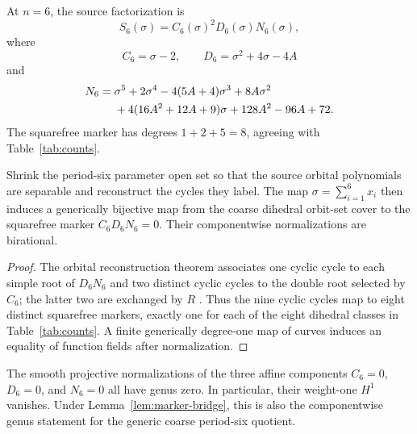 At $n=6$, the source factorization is
\begin{equation}
S_6(\sigma)=C_6(\sigma)^2D_6(\sigma)N_6(\sigma),
\end{equation}
where
\begin{equation}
C_6=\sigma-2,\qquad D_6=\sigma^2+4\sigma-4A
\end{equation}
and
\begin{align}
N_6={}&\sigma^5+2\sigma^4-4(5A+4)\sigma^3+8A\sigma^2\notag\\
&+4(16A^2+12A+9)\sigma+128A^2-96A+72.
\label{eq:N6}
\end{align}
The squarefree marker has degrees $1+2+5=8$, agreeing with
Table~\ref{tab:counts}.

\begin{lemma}\label{lem:marker-bridge}
Shrink the period-six parameter open set so that the source orbital
polynomials are separable and reconstruct the cycles they label.  The map
$\sigma=\sum_{i=1}^6x_i$ then induces a generically bijective map from the
coarse dihedral orbit-set cover to the squarefree marker
$C_6D_6N_6=0$.  Their componentwise normalizations are birational.
\end{lemma}

\begin{proof}
The orbital reconstruction theorem associates one cyclic cycle to each simple
root of $D_6N_6$ and two distinct cyclic cycles to the double root selected by
$C_6$; the latter two are exchanged by $R$
\citep{endler2004,endler2006chiral}.  Thus the nine cyclic cycles map to eight
distinct squarefree markers, exactly one for each of the eight dihedral
classes in Table~\ref{tab:counts}.  A finite generically degree-one map of
curves induces an equality of function fields after normalization.
\end{proof}

\begin{proposition}\label{prop:genus0}
The smooth projective normalizations of the three affine components
$C_6=0$, $D_6=0$, and $N_6=0$ all have genus zero.  In particular, their
weight-one $H^1$ vanishes.  Under Lemma~\ref{lem:marker-bridge}, this is also
the componentwise genus statement for the generic coarse period-six quotient.
\end{proposition}

